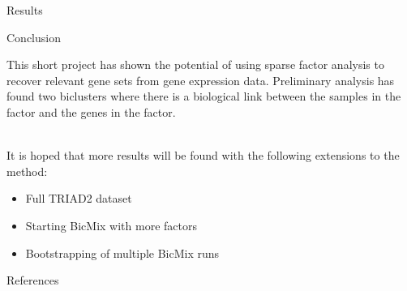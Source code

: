 \documentclass[final]{beamer}
\newlength{\onecolwid}
\begin{document}
\begin{frame}[t]
\begin{columns}[t]
\begin{column}{\onecolwid}
\begin{block}{Results}
\end{block}


\begin{block}{Conclusion}

This short project has shown the potential of using sparse factor analysis to recover relevant gene sets from gene expression data. Preliminary analysis has found two biclusters where there is a biological link between the samples in the factor and the genes in the factor.\\~\

It is hoped that more results will be found with the following extensions to the method:

\begin{itemize}
\setlength{\itemindent}{2em}
\item{Full TRIAD2 dataset}
\item{Starting BicMix with more factors}
\item{Bootstrapping of multiple BicMix runs}
\end{itemize}


\end{block}


\begin{block}{References}

\nocite{*} %
{
}

\end{block}



\end{column}
\end{columns}
\end{frame}
\end{document}
